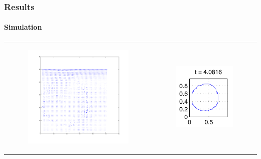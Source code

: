 \documentclass[ucs]{beamer}
\begin{document}
\begin{frame}
\frametitle{Results}
\framesubtitle{Simulation}
\begin{tabular}{l l}
\begin{minipage}{0.5\textwidth}

\begin{figure}[h!]
\includegraphics[width=7cm]{plots/vel4.png}
\end{figure}
\end{minipage}
&
\begin{minipage}{0.5\textwidth}
\begin{figure}[h!]
  \includegraphics[width=4cm]{plots/interface_t4.png}
\end{figure}
\end{minipage}
\end{tabular}

\end{frame}
\end{document}
